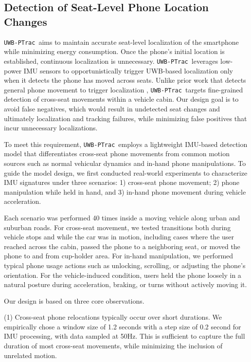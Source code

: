 \documentclass[sigconf]{acmart}
\newcommand{\name}{{{\tt UWB-PTrac}}}
\begin{document}
\subsection{Detection of Seat-Level 
Phone Location Changes} \label{sec:system::trigger}
%
\name~aims to maintain accurate seat-level localization of the smartphone 
while minimizing energy consumption.
%
Once the phone's initial location is established, continuous localization is 
unnecessary. \name\ leverages low-power IMU sensors to opportunistically trigger 
UWB-based localization only when it detects the phone has moved across seats.
%
Unlike prior work that detects general phone movement to trigger localization 
\cite{kim2010sensloc, zhuang2010improving}, \name\ targets fine-grained 
detection of cross-seat movements within a vehicle cabin.
%
Our design goal is to avoid false negatives, which would result in undetected
seat changes and ultimately localization and tracking failures, while
minimizing false positives that incur unnecessary localizations.

To meet this requirement, \name\ employs a lightweight IMU-based detection model 
that differentiates cross-seat phone movements from common motion sources 
such as normal vehicular dynamics and in-hand phone manipulations.
%
To guide the model design, we first conducted real-world experiments to 
characterize IMU signatures under three scenarios: 1) cross-seat phone movement; 
2) phone manipulation while held in hand, and 3) in-hand phone movement 
during vehicle acceleration.
%

%
Each scenario was performed 40 times inside a moving vehicle along urban and 
suburban roads. For cross-seat movement, we tested transitions both during 
vehicle stops and while the car was in motion, including cases where the user 
reached across the cabin, passed the phone to a neighboring seat, or moved the 
phone to and from cup-holder area. For in-hand manipulation, we performed 
typical phone usage actions such as unlocking, scrolling, or adjusting the phone's 
orientation. For the vehicle-induced condition, users held the phone loosely in a 
natural posture during acceleration, braking, or turns without actively moving it.

Our design is based on three core observations.

(1) Cross-seat phone relocations typically occur over short durations.
%
We empirically chose a window size of 1.2 seconds with a step size of 0.2 second 
for IMU processing, with data sampled at 50Hz.
%
This is sufficient to capture the full duration of most cross-seat movements,
while minimizing the inclusion of unrelated motion.
\end{document}
